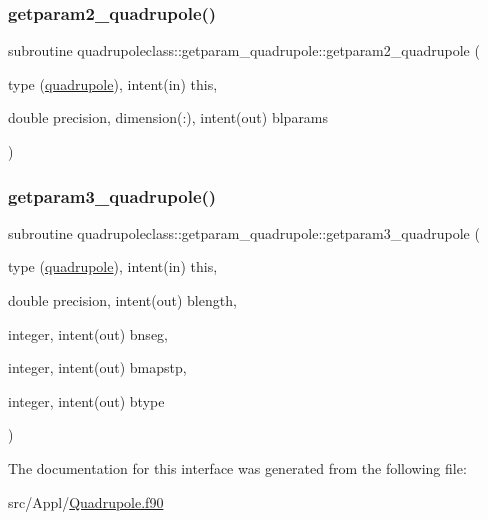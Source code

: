\mbox{\label{interfacequadrupoleclass_1_1getparam__quadrupole_a3a1cfa281d5e6b0e32bc505b252b5e90}} 
\subsubsection{\texorpdfstring{getparam2\_quadrupole()}{getparam2\_quadrupole()}}
{\footnotesize\ttfamily subroutine quadrupoleclass\+::getparam\+\_\+quadrupole\+::getparam2\+\_\+quadrupole (\begin{DoxyParamCaption}\item[{type (\mbox{\hyperlink{namespacequadrupoleclass_structquadrupoleclass_1_1quadrupole}{quadrupole}}), intent(in)}]{this,  }\item[{double precision, dimension(\+:), intent(out)}]{blparams }\end{DoxyParamCaption})}

\mbox{\label{interfacequadrupoleclass_1_1getparam__quadrupole_ab47260d217f2b2e9d7da32c7f0f2e0c5}} 
\subsubsection{\texorpdfstring{getparam3\_quadrupole()}{getparam3\_quadrupole()}}
{\footnotesize\ttfamily subroutine quadrupoleclass\+::getparam\+\_\+quadrupole\+::getparam3\+\_\+quadrupole (\begin{DoxyParamCaption}\item[{type (\mbox{\hyperlink{namespacequadrupoleclass_structquadrupoleclass_1_1quadrupole}{quadrupole}}), intent(in)}]{this,  }\item[{double precision, intent(out)}]{blength,  }\item[{integer, intent(out)}]{bnseg,  }\item[{integer, intent(out)}]{bmapstp,  }\item[{integer, intent(out)}]{btype }\end{DoxyParamCaption})}



The documentation for this interface was generated from the following file\+:\begin{DoxyCompactItemize}
\item 
src/\+Appl/\mbox{\hyperlink{_quadrupole_8f90}{Quadrupole.\+f90}}\end{DoxyCompactItemize}
